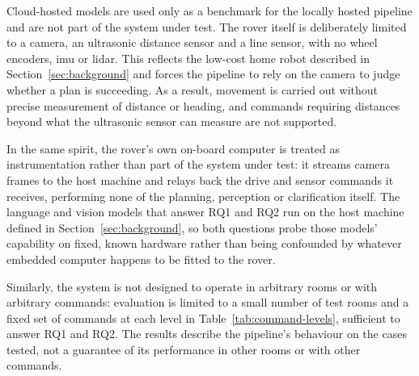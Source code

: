 Cloud-hosted models are used only as a benchmark for the locally hosted pipeline and are not
part of the system under test. The rover itself is deliberately limited to a camera, an
ultrasonic distance sensor and a line sensor, with no wheel encoders, \ac{imu} or \acs{lidar}. This
reflects the low-cost home robot described in Section~\ref{sec:background} and forces the
pipeline to rely on the camera to judge whether a plan is succeeding. As a result, movement is carried out without precise measurement of
distance or heading, and commands requiring distances beyond what the ultrasonic sensor can
measure are not supported.

In the same spirit, the rover's own on-board computer is treated as instrumentation rather
than part of the system under test: it streams camera frames to the host machine and relays
back the drive and sensor commands it receives, performing none of the planning, perception or
clarification itself. The language and vision models that answer RQ1 and RQ2 run on the host
machine defined in Section~\ref{sec:background}, so both questions probe those models'
capability on fixed, known hardware rather than being confounded by whatever embedded computer
happens to be fitted to the rover.

Similarly, the system is not designed to operate in arbitrary rooms or with arbitrary commands:
evaluation is limited to a small number of test rooms and a fixed set of commands at each level
in Table~\ref{tab:command-levels}, sufficient to answer RQ1 and RQ2. The results describe the
pipeline's behaviour on the cases tested, not a guarantee of its performance in other rooms or
with other commands.
